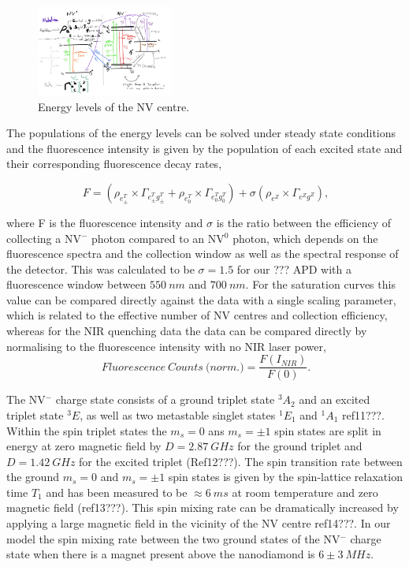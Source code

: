 \documentclass[prl]{revtex4}
\begin{document}
\begin{figure}[H]
  \centering
  \includegraphics[width=0.4\textwidth]{NVjpg.jpg} 
 \caption{Energy levels of the NV centre.} \label{FigEnergyLevelsNV}
\end{figure}

The populations of the energy levels can be solved under steady state conditions and the fluorescence intensity is given by the population of each excited state and their corresponding fluorescence decay rates,

\begin{equation}
\SI{}{F} = \left(\rho_{e^{T}_\pm}\times\Gamma_{e^T_{\pm}g^T_{\pm}} +\rho_{e^{T}_0}\times\Gamma_{e^T_{0}g^T_{0}}\right)+\sigma\left(\rho_{e^Z}\times\Gamma_{e^Zg^Z}\right),
\label{EqnFluoro}
\end{equation}

where F is the fluorescence intensity and $\sigma$ is the ratio between the efficiency of collecting a NV$^-$ photon compared to an NV$^0$ photon, which depends on the fluorescence spectra and the collection window as well as the spectral response of the detector. This was calculated to be $\sigma=1.5$ for our ??? APD with a fluorescence window between $\SI{550}{nm}$ and $\SI{700}{nm}$. For the saturation curves this value can be compared directly against the data with a single scaling parameter, which is related to the effective number of NV centres and collection efficiency, whereas for the NIR quenching data the data can be compared directly by normalising to the fluorescence intensity with no NIR laser power,
\begin{equation}
\SI{}{Fluorescence\ Counts\ (norm}.) = \frac{F(I_{NIR})}{F(0)}.
\label{EqnFluoroCounts}
\end{equation}


The NV$^-$ charge state consists of a ground triplet state $^3A_2$ and an excited triplet state $^3E$, as well as two metastable singlet states $^1E_1$ and $^1A_1$ ref11???. Within the spin triplet states the $m_s = 0$ ans $m_s = \pm1$ spin states are split in energy at zero magnetic field by $D=\SI{2.87}{GHz}$ for the ground triplet and $D=\SI{1.42}{GHz}$ for the excited triplet (Ref12???). The spin transition rate between the ground $m_s = 0$ and $m_s = \pm1$ spin states is given by the spin-lattice relaxation time $T_1$ and has been measured to be $\approx\SI{6}{ms}$ at room temperature and zero magnetic field (ref13???). This spin mixing rate can be dramatically increased by applying a large magnetic field in the vicinity of the NV centre ref14???. In our model the spin mixing rate between the two ground states of the NV$^-$ charge state when there is a magnet present above the nanodiamond is $6\pm \SI{3}{MHz}$.
\end{document}
